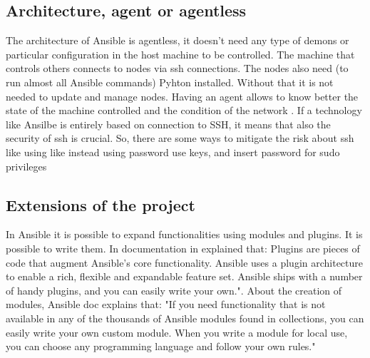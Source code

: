 \documentclass[12pt,a4paper,openright,twoside]{book}
\begin{document}
\subsection{Architecture, agent or agentless}
The architecture of Ansible is agentless, it doesn't need any type of demons or particular configuration in the host machine to be controlled.
The machine that controls others connects to nodes via ssh connections. The nodes also need (to run almost all Ansible commands) Pyhton installed.
Without that it is not needed to update and manage nodes. Having an agent allows to know better the state of the machine controlled and the condition of the network .
If a technology like Ansilbe is entirely based on connection to SSH, it means that also the security of ssh is crucial.
So, there are some ways to mitigate the risk about ssh like using like instead using password use keys, and insert password for sudo privileges\cite{ansibleSSH}


\subsection{Extensions of the project}
In Ansible it is possible to expand functionalities using modules and plugins.
It is possible to write them. In documentation in explained that:
Plugins are pieces of code that augment Ansible’s core functionality. Ansible uses a plugin architecture to enable a rich, flexible and expandable feature set.
Ansible ships with a number of handy plugins, and you can easily write your own."\cite{ansibleDocPlugins}.
About the creation of modules, Ansible doc explains that:
"If you need functionality that is not available in any of the thousands of Ansible modules found in collections, you can easily write your own custom module. When you write a module for local use, you can choose any programming language and follow your own rules."\cite{ansibleDocNewModules}
\end{document}
